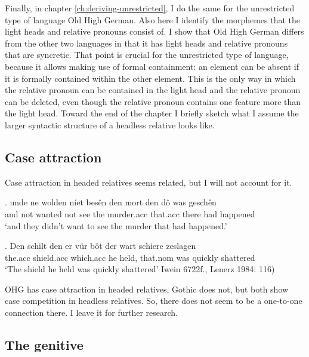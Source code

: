 Finally, in chapter \ref{ch:deriving-unrestricted}, I do the same for the unrestricted type of language Old High German. Also here I identify the morphemes that the light heads and relative pronouns consist of. I show that Old High German differs from the other two languages in that it has light heads and relative pronouns that are syncretic. That point is crucial for the unrestricted type of language, because it allows making use of formal containment: an element can be absent if it is formally contained within the other element. This is the only way in which the relative pronoun can be contained in the light head and the relative pronoun can be deleted, even though the relative pronoun contains one feature more than the light head. Toward the end of the chapter I briefly sketch what I assume the larger syntactic structure of a headless relative looks like.





\subsection{Case attraction}\label{sec:attraction}

Case attraction in headed relatives seems related, but I will not account for it.

\exg. unde ne wolden níet besên den mort den dô was geschên\\
 and not wanted not see the murder.\ac{acc} that.\ac{acc} there had happened\\
 `and they didn't want to see the murder that had happened.' 

 \exg. Den schilt den er {vür bôt} der wart schiere zeslagen\\
 the.\ac{acc} shield.\ac{acc} which.\ac{acc} he held, that.\ac{nom} was quickly shattered\\
 `The shield he held was quickly shattered' \label{ex:iaheaded}\hfill Iwein 6722f., Lenerz 1984: 116)

OHG has case attraction in headed relatives, Gothic does not, but both show case competition in headless relatives. So, there does not seem to be a one-to-one connection there. I leave it for further research.

\subsection{The genitive}\label{sec:genitive}

